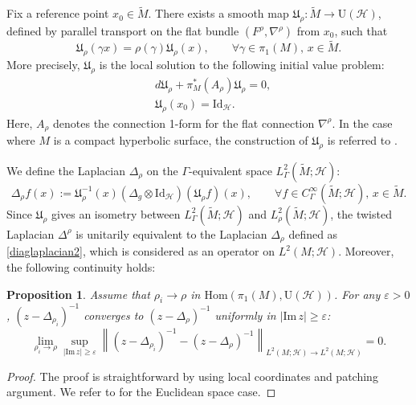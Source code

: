 \documentclass[11pt,oneside,reqno]{amsart}
\newtheorem{proposition}[theorem]{Proposition}
\theoremstyle{definition}
\numberwithin{equation}{section}
\theoremstyle{plain}
\begin{document}
Fix a reference point $x_0 \in \widetilde{M}$. There exists a smooth map $\mathfrak{U}_{\rho}: \widetilde{M} \to \mathrm{U}(\mathcal{H})$, defined by parallel transport on the flat bundle $(F^{\rho}, \nabla^{\rho})$ from $x_0$, such that
\begin{equation}\label{equivalent}
\mathfrak{U}_{\rho}(\gamma x) = \rho(\gamma)\mathfrak{U}_{\rho}(x), \qquad  \forall \gamma \in \pi_1(M), \, x \in \widetilde{M}.
\end{equation}
More precisely, $\mathfrak{U}_{\rho}$ is the local solution to the following initial value problem:
\begin{equation*}
\begin{aligned}
&d\mathfrak{U}_{\rho} + \pi_M^*(A_{\rho})\mathfrak{U}_{\rho} = 0, \\
&\mathfrak{U}_{\rho}(x_0) = \mathrm{Id}_{\mathcal{H}}.
\end{aligned}
\end{equation*}
Here, $A_{\rho}$ denotes the connection 1-form for the flat connection $\nabla^{\rho}$. In the case where $M$ is a compact hyperbolic surface, the construction of $\mathfrak{U}_{\rho}$ is referred to \cite{nagy2024hyperbolic}. 

We define the Laplacian $\Delta_\rho$ on the $\Gamma$-equivalent space $L^2_{\Gamma}(\widetilde{M};\mathcal{H})$:
\begin{equation}\label{diaglaplacian2}
   \Delta_{\rho}f(x):=\mathfrak{U}_{\rho}^{-1}(x)(\Delta_g\otimes \mathrm{Id}_{\mathcal{H}})(\mathfrak{U}_{\rho}f)(x), \qquad  \forall f\in C^{\infty}_{\Gamma}(\widetilde{M};\mathcal{H}), \, x\in \widetilde{M}.
\end{equation} 
Since $\mathfrak{U}_{\rho}$ gives an isometry between $L^2_{\Gamma}(\widetilde{M};\mathcal{H}) $ and $L^2_{\rho}(\widetilde{M};\mathcal{H})$, the twisted Laplacian $\Delta^\rho$ is unitarily equivalent to the Laplacian $\Delta_{\rho}$ defined as \eqref{diaglaplacian2}, which is considered as an operator on $L^2(M;\mathcal{H})$. Moreover, the following continuity holds:

\begin{proposition}\label{convergeofresolvent}
Assume that $\rho_i \to \rho$ in $\mathrm{Hom}(\pi_1(M), \mathrm{U}(\mathcal{H}))$. For any $\varepsilon > 0$, $(z-\Delta_{\rho_i})^{-1}$ converges to $(z-\Delta_{\rho})^{-1}$ uniformly in $|\mathrm{Im}\, z| \geq \varepsilon$:
\begin{equation*}
\lim_{\rho_i\rightarrow \rho} \sup_{|\mathrm{Im}\, z| \geq \varepsilon}\left\| (z - \Delta_{\rho_i})^{-1} - (z - \Delta_{\rho})^{-1} \right\|_{L^2(M;\mathcal{H})\rightarrow L^2(M;\mathcal{H})} =0.
\end{equation*}
\end{proposition}
\begin{proof}
    The proof is straightforward by using local coordinates and patching argument. We refer to \cite[Proposition~3.2]{balch2023obs} for the Euclidean space case.
\end{proof}
\end{document}
